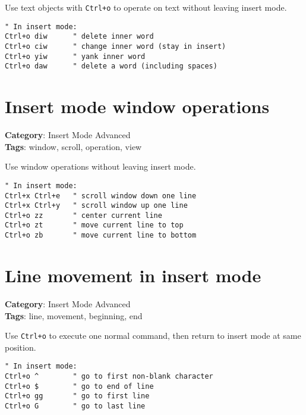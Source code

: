 {{{{{{Use text objects with {\footnotesize \Verb§Ctrl+o§} to operate on text without leaving insert mode.

\begin{Exa*}{}
\begin{Verbatim}[fontsize=\footnotesize, breaklines, breakanywhere]
" In insert mode:
Ctrl+o diw      " delete inner word
Ctrl+o ciw      " change inner word (stay in insert)
Ctrl+o yiw      " yank inner word
Ctrl+o daw      " delete a word (including spaces)
\end{Verbatim}
\end{Exa*}

\section{Insert mode window operations}

\textbf{Category}: Insert Mode Advanced\\ \textbf{Tags}: window, scroll, operation, view
\vspace{0.5cm}

Use window operations without leaving insert mode.

\begin{Exa*}{}
\begin{Verbatim}[fontsize=\footnotesize, breaklines, breakanywhere]
" In insert mode:
Ctrl+x Ctrl+e   " scroll window down one line
Ctrl+x Ctrl+y   " scroll window up one line  
Ctrl+o zz       " center current line
Ctrl+o zt       " move current line to top
Ctrl+o zb       " move current line to bottom
\end{Verbatim}
\end{Exa*}

\section{Line movement in insert mode}

\textbf{Category}: Insert Mode Advanced\\ \textbf{Tags}: line, movement, beginning, end
\vspace{0.5cm}

Use {\footnotesize \Verb§Ctrl+o§} to execute one normal command, then return to insert mode at same position.

\begin{Exa*}{}
\begin{Verbatim}[fontsize=\footnotesize, breaklines, breakanywhere]
" In insert mode:
Ctrl+o ^        " go to first non-blank character
Ctrl+o $        " go to end of line
Ctrl+o gg       " go to first line
Ctrl+o G        " go to last line
\end{Verbatim}
\end{Exa*}

}}}}}}
